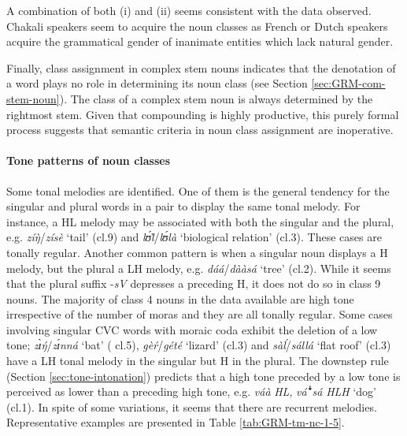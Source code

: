 \begin{exe}
\begin{exe}
\begin{exe}
{\begin{exe}
\begin{exe}
\begin{exe}
\begin{exe}
\begin{enumerate}
\end{enumerate}

A combination of both (i) and (ii) seems consistent with the data
observed. Chakali speakers seem to acquire the noun classes as French or Dutch
speakers acquire
the grammatical gender of inanimate entities which lack natural gender.


Finally, class assignment in complex stem nouns indicates  that the 
denotation of a word plays no role in determining its noun
class (see Section \ref{sec:GRM-com-stem-noun}). 
The class of a complex stem noun is always determined by the rightmost stem.
Given that compounding is highly productive,  this purely  formal
process suggests that semantic criteria in
noun class assignment are inoperative.

\paragraph{Tone patterns of noun classes}
\label{sec:GRM-tone-p}

Some tonal melodies are identified. One of them is the  general tendency for
the singular and  plural words in a pair to display the same tonal melody. For
instance, a HL melody may be associated with both the singular and the plural,
e.g.  {\it zíŋ̀}/{\it zísè} `tail' ({\sc cl.9}) 
and   {\it lʊ́l̀}/{\it lʊ́là} `biological relation'  ({\sc cl.3}). These cases 
are tonally regular. 
Another common pattern is when a singular noun displays a H melody, but the
plural a LH melody, e.g.  {\it dáá}/{\it dààsá} `tree' ({\sc cl.2}). While 
it
 seems that  the
plural suffix -{\it sV}  depresses a preceding H,  it does not do so in class 9
nouns.
The majority of class 4 nouns in the data available are high tone irrespective
of the number of moras and they are all tonally regular. Some cases involving
singular CVC words with moraic
coda exhibit the deletion of a low tone;  {\it zɪ̀ŋ́}/{\it zɪ́nná} `bat' ({\sc 
cl.5}),   {\it gèŕ}/{\it gété} `lizard' ({\sc cl.3}) and
{\it sàĺ}/{\it sállá} `flat roof' ({\sc cl.3})  have a LH tonal melody in 
the
singular but  H in the plural. The downstep rule (Section
\ref{sec:tone-intonation})  predicts that a high tone preceded by a low tone is
perceived as lower than a preceding high
tone, e.g. {\it váà} {\it HL},  {\it vá{\T ꜜ}sá} {\it HLH}  `dog' 
({\sc cl.1}).  
In
spite of some variations,  it seems that there are recurrent
melodies. Representative examples are presented in
Table \ref{tab:GRM-tm-nc-1-5}.
 


\end{exe}
\end{exe}
\end{exe}
\end{exe}}
\end{exe}
\end{exe}
\end{exe}
